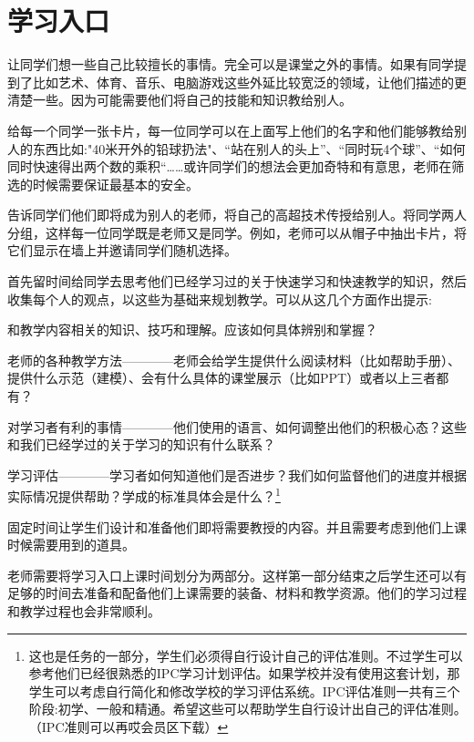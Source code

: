 \chapter{学习入口}
    让同学们想一些自己比较擅长的事情。完全可以是课堂之外的事情。如果有同学提到了比如艺术、体育、音乐、电脑游戏这些外延比较宽泛的领域，让他们描述的更清楚一些。因为可能需要他们将自己的技能和知识教给别人。\par
    给每一个同学一张卡片，每一位同学可以在上面写上他们的名字和他们能够教给别人的东西比如:"40米开外的铅球扔法"、“站在别人的头上”、“同时玩4个球”、“如何同时快速得出两个数的乘积“……或许同学们的想法会更加奇特和有意思，老师在筛选的时候需要保证最基本的安全。\par
    告诉同学们他们即将成为别人的老师，将自己的高超技术传授给别人。将同学两人分组，这样每一位同学既是老师又是同学。例如，老师可以从帽子中抽出卡片，将它们显示在墙上并邀请同学们随机选择。\par
    首先留时间给同学去思考他们已经学习过的关于快速学习和快速教学的知识，然后收集每个人的观点，以这些为基础来规划教学。可以从这几个方面作出提示:\par
    \begin{item}
      \item 和教学内容相关的知识、技巧和理解。应该如何具体辨别和掌握？
      \item 老师的各种教学方法————老师会给学生提供什么阅读材料（比如帮助手册）、提供什么示范（建模）、会有什么具体的课堂展示（比如PPT）或者以上三者都有？
      \item 对学习者有利的事情————他们使用的语言、如何调整出他们的积极心态？这些和我们已经学过的关于学习的知识有什么联系？
      \item  学习评估————学习者如何知道他们是否进步？我们如何监督他们的进度并根据实际情况提供帮助？学成的标准具体会是什么？\footnote{这也是任务的一部分，学生们必须得自行设计自己的评估准则。不过学生可以参考他们已经很熟悉的IPC学习计划评估。如果学校并没有使用这套计划，那学生可以考虑自行简化和修改学校的学习评估系统。IPC评估准则一共有三个阶段:初学、一般和精通。希望这些可以帮助学生自行设计出自己的评估准则。（IPC准则可以再哎会员区下载）} 
    \end{item}
    \par
    固定时间让学生们设计和准备他们即将需要教授的内容。并且需要考虑到他们上课时候需要用到的道具。\par
    老师需要将学习入口上课时间划分为两部分。这样第一部分结束之后学生还可以有足够的时间去准备和配备他们上课需要的装备、材料和教学资源。他们的学习过程和教学过程也会非常顺利。\par
